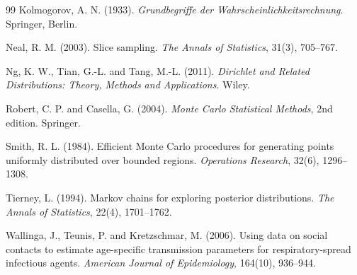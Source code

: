 \documentclass[11pt,a4paper]{article}
\theoremstyle{definition}
\theoremstyle{remark}
\begin{document}
\begin{thebibliography}{99}
Kolmogorov, A. N. (1933).
\emph{Grundbegriffe der Wahrscheinlichkeitsrechnung}. Springer, Berlin.

Neal, R. M. (2003).
Slice sampling.
\emph{The Annals of Statistics}, 31(3), 705--767.

Ng, K. W., Tian, G.-L. and Tang, M.-L. (2011).
\emph{Dirichlet and Related Distributions: Theory, Methods and
Applications}. Wiley.

Robert, C. P. and Casella, G. (2004).
\emph{Monte Carlo Statistical Methods}, 2nd edition. Springer.

Smith, R. L. (1984).
Efficient Monte Carlo procedures for generating points uniformly distributed
over bounded regions.
\emph{Operations Research}, 32(6), 1296--1308.

Tierney, L. (1994).
Markov chains for exploring posterior distributions.
\emph{The Annals of Statistics}, 22(4), 1701--1762.

Wallinga, J., Teunis, P. and Kretzschmar, M. (2006).
Using data on social contacts to estimate age-specific transmission
parameters for respiratory-spread infectious agents.
\emph{American Journal of Epidemiology}, 164(10), 936--944.

\end{thebibliography}
\end{document}
